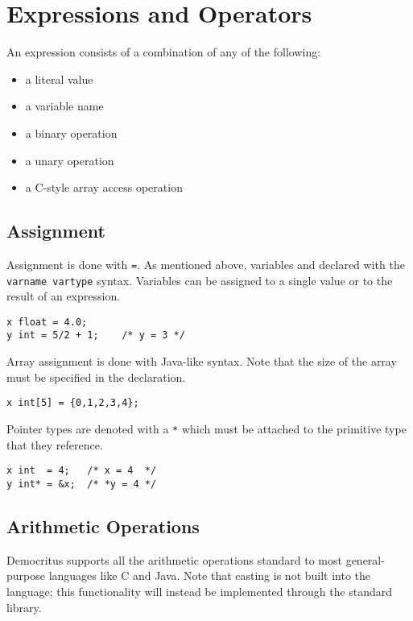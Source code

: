 \section{Expressions and Operators}
	An expression consists of a combination of any of the following:
    \begin{itemize}
        \item a literal value
        \item a variable name
        \item a binary operation
        \item a unary operation
        \item a C-style array access operation
    \end{itemize}
    \subsection{Assignment}
		Assignment is done with \texttt{=}. As mentioned above, variables and declared with the \texttt{varname vartype} syntax. Variables can be assigned to a single value or to the result of an expression. 
		
		\begin{lstlisting}
x float = 4.0;
y int = 5/2 + 1; 	/* y = 3 */
		\end{lstlisting}
		
		\noindent Array assignment is done with Java-like syntax. Note that the size of the array must be specified in the declaration. 
		
		\begin{lstlisting}
x int[5] = {0,1,2,3,4};
		\end{lstlisting}
		
		\noindent Pointer types are denoted with a \texttt{*} which must be attached to the primitive type that they reference.
		
		\begin{lstlisting}
x int  = 4;   /* x = 4  */
y int* = &x;  /* *y = 4 */
		\end{lstlisting}
		
	\subsection{Arithmetic Operations}
		Democritus supports all the arithmetic operations standard to most general-purpose languages like C and Java. Note that casting is not built into the language; this functionality will instead be implemented through the standard library.
		
